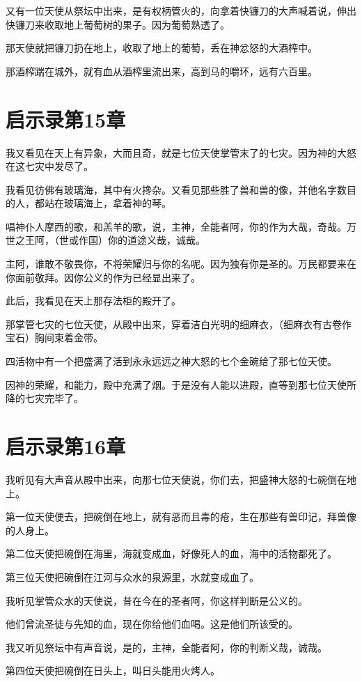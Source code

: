 \documentclass[12pt,oneside]{book}
\begin{document}
又有一位天使从祭坛中出来，是有权柄管火的，向拿着快镰刀的大声喊着说，伸出快镰刀来收取地上葡萄树的果子。因为葡萄熟透了。

那天使就把镰刀扔在地上，收取了地上的葡萄，丢在神忿怒的大酒榨中。

那酒榨踹在城外，就有血从酒榨里流出来，高到马的嚼环，远有六百里。

\chapter{启示录第15章}
我又看见在天上有异象，大而且奇，就是七位天使掌管末了的七灾。因为神的大怒在这七灾中发尽了。

我看见彷佛有玻璃海，其中有火搀杂。又看见那些胜了兽和兽的像，并他名字数目的人，都站在玻璃海上，拿着神的琴。

唱神仆人摩西的歌，和羔羊的歌，说，主神，全能者阿，你的作为大哉，奇哉。万世之王阿，（世或作国）你的道途义哉，诚哉。

主阿，谁敢不敬畏你，不将荣耀归与你的名呢。因为独有你是圣的。万民都要来在你面前敬拜。因你公义的作为已经显出来了。

此后，我看见在天上那存法柜的殿开了。

那掌管七灾的七位天使，从殿中出来，穿着洁白光明的细麻衣，（细麻衣有古卷作宝石）胸间束着金带。

四活物中有一个把盛满了活到永永远远之神大怒的七个金碗给了那七位天使。

因神的荣耀，和能力，殿中充满了烟。于是没有人能以进殿，直等到那七位天使所降的七灾完毕了。

\chapter{启示录第16章}
我听见有大声音从殿中出来，向那七位天使说，你们去，把盛神大怒的七碗倒在地上。

第一位天使便去，把碗倒在地上，就有恶而且毒的疮，生在那些有兽印记，拜兽像的人身上。

第二位天使把碗倒在海里，海就变成血，好像死人的血，海中的活物都死了。

第三位天使把碗倒在江河与众水的泉源里，水就变成血了。

我听见掌管众水的天使说，昔在今在的圣者阿，你这样判断是公义的。

他们曾流圣徒与先知的血，现在你给他们血喝。这是他们所该受的。

我又听见祭坛中有声音说，是的，主神，全能者阿，你的判断义哉，诚哉。

第四位天使把碗倒在日头上，叫日头能用火烤人。
\end{document}
